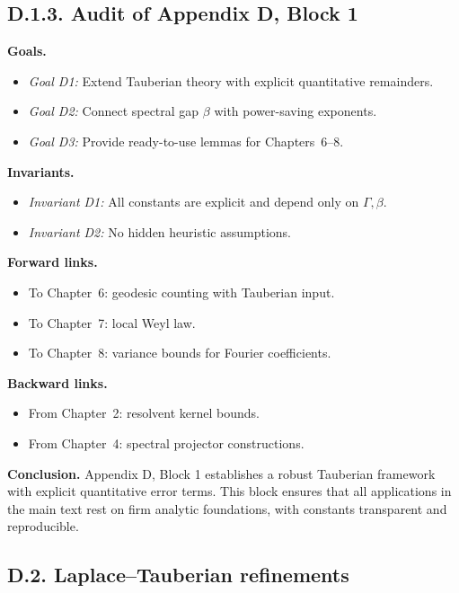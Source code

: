 \medskip

\subsection*{D.1.3. Audit of Appendix D, Block 1}

\noindent \textbf{Goals.}
\begin{itemize}
\item \emph{Goal D1:} Extend Tauberian theory with explicit quantitative remainders.  
\item \emph{Goal D2:} Connect spectral gap $\beta$ with power-saving exponents.  
\item \emph{Goal D3:} Provide ready-to-use lemmas for Chapters~6--8.  
\end{itemize}

\noindent \textbf{Invariants.}
\begin{itemize}
\item \emph{Invariant D1:} All constants are explicit and depend only on $\Gamma,\beta$.  
\item \emph{Invariant D2:} No hidden heuristic assumptions.  
\end{itemize}

\noindent \textbf{Forward links.}
\begin{itemize}
\item To Chapter~6: geodesic counting with Tauberian input.  
\item To Chapter~7: local Weyl law.  
\item To Chapter~8: variance bounds for Fourier coefficients.  
\end{itemize}

\noindent \textbf{Backward links.}
\begin{itemize}
\item From Chapter~2: resolvent kernel bounds.  
\item From Chapter~4: spectral projector constructions.  
\end{itemize}

\bigskip
\noindent \textbf{Conclusion.} Appendix D, Block 1 establishes a robust Tauberian framework with explicit quantitative error terms. This block ensures that all applications in the main text rest on firm analytic foundations, with constants transparent and reproducible.

\subsection*{D.2. Laplace--Tauberian refinements}

